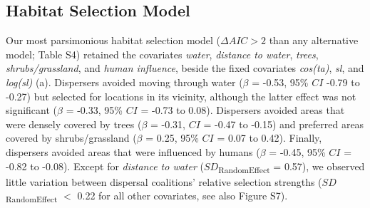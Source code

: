 \documentclass[abstract=on,10pt,a4paper,bibliography=totocnumbered]{article}
\begin{document}
\subsection{Habitat Selection Model}
Our most parsimonious habitat selection model (\(\Delta AIC > 2\) than any
alternative model; Table S4) retained the covariates \textit{water},
\textit{distance to water}, \textit{trees}, \textit{shrubs/grassland}, and
\textit{human influence}, beside the fixed covariates \textit{cos(ta)},
\textit{sl}, and \textit{log(sl)} (a). Dispersers
avoided moving through water (\(\beta\) = -0.53, 95\% \(CI\) -0.79 to -0.27) but
selected for locations in its vicinity, although the latter effect was not
significant (\(\beta\) = -0.33, 95\% \(CI\) = -0.73 to 0.08). Dispersers avoided
areas that were densely covered by trees (\(\beta\) = -0.31, \(CI\) = -0.47 to
-0.15) and preferred areas covered by shrubs/grassland (\(\beta\) = 0.25, 95\%
\(CI\) = 0.07 to 0.42). Finally, dispersers avoided areas that were influenced
by humans (\(\beta\) = -0.45, 95\% \(CI\) = -0.82 to -0.08). Except for
\textit{distance to water} (\(SD\)\textsubscript{RandomEffect} = 0.57), we
observed little variation between dispersal coalitions' relative selection
strengths (\(SD\)\textsubscript{RandomEffect} \(<\) 0.22 for all other
covariates, see also Figure S7).
\end{document}

